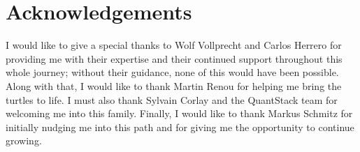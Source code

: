 \chapter{Acknowledgements}

I would like to give a special thanks to Wolf Vollprecht and Carlos Herrero for providing me with their expertise and their continued support throughout this whole journey; without their guidance, none of this would have been possible. Along with that, I would like to thank Martin Renou for helping me bring the turtles to life. I must also thank Sylvain Corlay and the QuantStack team for welcoming me into this family. Finally, I would like to thank Markus Schmitz for initially nudging me into this path and for giving me the opportunity to continue growing.
